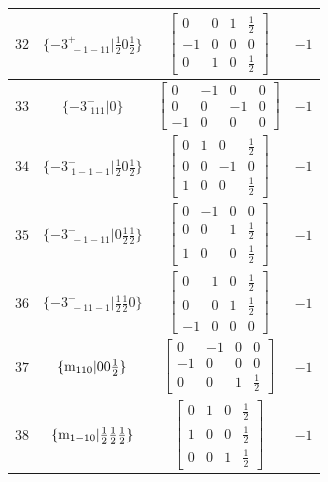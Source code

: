 \documentclass[fleqn,8pt]{jsarticle}
\begin{document}
\begin{longtable}{cccc}
$ 32 $ & $ \{-3^{+}_{\,\,-1-11}|\frac{1}{2} 0 \frac{1}{2}\} $ & $ \begin{bmatrix} 0 & 0 & 1 & \frac{1}{2} \\ -1 & 0 & 0 & 0 \\ 0 & 1 & 0 & \frac{1}{2} \end{bmatrix} $ & $ -1 $ \\ \hline
$ 33 $ & $ \{-3^{-}_{\,\,111}|0\} $ & $ \begin{bmatrix} 0 & -1 & 0 & 0 \\ 0 & 0 & -1 & 0 \\ -1 & 0 & 0 & 0 \end{bmatrix} $ & $ -1 $ \\ \hline
$ 34 $ & $ \{-3^{-}_{\,\,1-1-1}|\frac{1}{2} 0 \frac{1}{2}\} $ & $ \begin{bmatrix} 0 & 1 & 0 & \frac{1}{2} \\ 0 & 0 & -1 & 0 \\ 1 & 0 & 0 & \frac{1}{2} \end{bmatrix} $ & $ -1 $ \\ \hline
$ 35 $ & $ \{-3^{-}_{\,\,-1-11}|0 \frac{1}{2} \frac{1}{2}\} $ & $ \begin{bmatrix} 0 & -1 & 0 & 0 \\ 0 & 0 & 1 & \frac{1}{2} \\ 1 & 0 & 0 & \frac{1}{2} \end{bmatrix} $ & $ -1 $ \\ \hline
$ 36 $ & $ \{-3^{-}_{\,\,-11-1}|\frac{1}{2} \frac{1}{2} 0\} $ & $ \begin{bmatrix} 0 & 1 & 0 & \frac{1}{2} \\ 0 & 0 & 1 & \frac{1}{2} \\ -1 & 0 & 0 & 0 \end{bmatrix} $ & $ -1 $ \\ \hline
$ 37 $ & $ \{{\rm m}_{110}|0 0 \frac{1}{2}\} $ & $ \begin{bmatrix} 0 & -1 & 0 & 0 \\ -1 & 0 & 0 & 0 \\ 0 & 0 & 1 & \frac{1}{2} \end{bmatrix} $ & $ -1 $ \\ \hline
$ 38 $ & $ \{{\rm m}_{1-10}|\frac{1}{2} \frac{1}{2} \frac{1}{2}\} $ & $ \begin{bmatrix} 0 & 1 & 0 & \frac{1}{2} \\ 1 & 0 & 0 & \frac{1}{2} \\ 0 & 0 & 1 & \frac{1}{2} \end{bmatrix} $ & $ -1 $ \\ \hline

\end{longtable}
\end{document}
